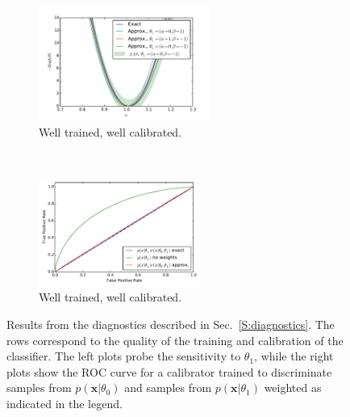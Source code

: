 \documentclass[12pt]{article}
\numberwithin{equation}{section}
\theoremstyle{plain}
\begin{document}
\begin{figure}
    \begin{subfigure}[t]{0.4\textwidth}
        \centering
        \includegraphics[clip, trim=0.3cm 0.3cm 0.3cm 0.3cm,height=10.075em]{figures/likelihood_comp_2.pdf}
        \caption{Well trained, well calibrated. }
        \label{fig:6e}
    \end{subfigure}
    ~
    \begin{subfigure}[t]{0.4\textwidth}
        \centering
        \includegraphics[clip, trim=0.3cm 0.3cm 0.3cm 0.3cm,height=9.5em]{figures/ROC_comp2.pdf}
        \caption{Well trained, well calibrated. }
        \label{fig:6f}
    \end{subfigure}

    \caption{Results from the diagnostics described in Sec.~\ref{S:diagnostics}.
    The rows correspond to the quality of the training and calibration of the classifier. The left plots probe the sensitivity to $\theta_1$, while the right plots show the ROC curve for a calibrator trained to discriminate samples from $p(\mathbf{x}|\theta_0)$ and samples from $p(\mathbf{x}|\theta_1)$ weighted as indicated in the legend. }

    \label{fig:diagnostics}
\end{figure}
\end{document}
